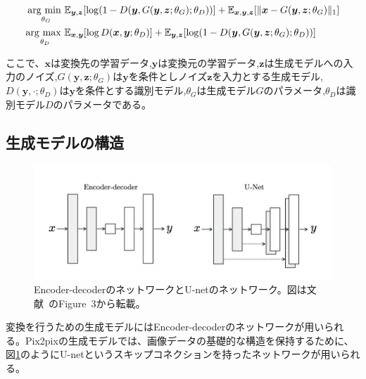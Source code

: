\begin{align}
    \label{eq:pix2pix_G}
    \mathop{\rm arg~min~}\limits _{\theta_G}& \mathbb{E}_{\boldsymbol{y}, \boldsymbol{z}}[\log (1-D(\boldsymbol{y}, G(\boldsymbol{y}, \boldsymbol{z}; \theta_G); \theta_D))]+\mathbb{E}_{\boldsymbol{x}, \boldsymbol{y}, \boldsymbol{z}}[\|\boldsymbol{x}-G(\boldsymbol{y}, \boldsymbol{z}; \theta_G)\|_{1}]\\
    \label{eq:pix2pix_D}
    \mathop{\rm arg~max~}\limits _{\theta_D}& \mathbb{E}_{\boldsymbol{x}, \boldsymbol{y}}[\log D(\boldsymbol{x}, \boldsymbol{y}; \theta_D)]+\mathbb{E}_{\boldsymbol{y}, \boldsymbol{z}}[\log (1-D(\boldsymbol{y}, G(\boldsymbol{y}, \boldsymbol{z}; \theta_G); \theta_D))]
\end{align}


ここで、$\boldsymbol{x}$は変換先の学習データ,$\boldsymbol{y}$は変換元の学習データ,$\boldsymbol{z}$は生成モデルへの入力のノイズ,$G(\boldsymbol{y},\boldsymbol{z};\theta_G)$は$\boldsymbol{y}$を条件としノイズ$\boldsymbol{z}$を入力とする生成モデル,$D(\boldsymbol{y},\cdot;\theta_D)$は$\boldsymbol{y}$を条件とする識別モデル,$\theta_G$は生成モデル$G$のパラメータ,$\theta_D$は識別モデル$D$のパラメータである。

\subsection{生成モデルの構造}

\begin{figure}[t]
\begin{center}
\includegraphics[width=\hsize]{figure/u-net.png}
\caption{Encoder-decoderのネットワークとU-netのネットワーク。図は文献~\cite{u-net}のFigure~3から転載。}
\label{fig:u-net}
\end{center}
\end{figure}


変換を行うための生成モデルにはEncoder-decoderのネットワークが用いられる。Pix2pixの生成モデルでは、画像データの基礎的な構造を保持するために、図\ref{fig:u-net}のようにU-net\cite{u-net}というスキップコネクションを持ったネットワークが用いられる。

